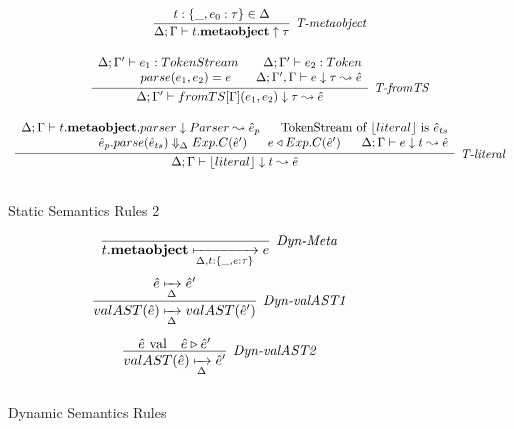 \begin{figure}
\[\begin{array}{c}
\infer[\textit{T-metaobject}]
        {\Delta; \Gamma \vdash t.\keyw{metaobject} \uparrow \tau   }
	{t:\{\_, e_0:\tau\} \in \Delta} \\[3ex]


\infer[\textit{T-fromTS}]
	  {\Delta; \Gamma' \vdash fromTS[\Gamma](e_1,e_2) \downarrow \tau \leadsto \hat{e} }
	  {\renewcommand{\arraystretch}{1}
	    \begin{array}{r}
	    \Delta;\Gamma' \vdash e_1:TokenStream ~~~~~~ \Delta;\Gamma' \vdash e_2:Token\\
            parse(e_1,e_2)=e ~~~~~~\Delta; \Gamma', \Gamma \vdash e \downarrow \tau \leadsto \hat{e}
            \end{array}
       } \\[3ex]  

\infer[\textit{T-literal}]
	  {\Delta; \Gamma \vdash \lfloor literal \rfloor \downarrow t \leadsto \hat{e} }
	  {\renewcommand{\arraystretch}{1}
	    \begin{array}{r}
	    \Delta;\Gamma \vdash t.\keyw{metaobject}.parser\downarrow Parser \leadsto \hat{e}_p ~~~~~ \text{TokenStream of~} \lfloor literal \rfloor\ \text{is}\ \hat{e}_{ts}\\
            \hat{e}_p.parse(\hat{e}_{ts}) \Downarrow_{\Delta} Exp.C(\hat{e}') ~~~~~  e \triangleleft Exp.C(\hat{e}')~~~~~ \Delta;\Gamma\vdash e\downarrow t \leadsto \hat{e}
            \end{array}
       } \\[3ex]   
\end{array}
\]
\caption{Static Semantics Rules 2}
\end{figure}

\begin{figure}
\centering
\[
\begin{array}{c}

\infer[\textit{Dyn-Meta}]
	{t.\keyw{metaobject} \xmapsto[\Delta,t:\{\_,e:\tau \}]{} e} 
	{}\\[3ex]

\infer[\textit{Dyn-valAST1}]
	{valAST(\hat{e}) \xmapsto[\Delta]{} valAST(\hat{e}') } 
	{\hat{e} \xmapsto[\Delta]{} \hat{e}'}\\[3ex]

\infer[\textit{Dyn-valAST2}]
	{valAST(\hat{e}) \xmapsto[\Delta]{} \hat{e}' } 
	{\hat{e}\ \text{val} &\hat{e} \triangleright \hat{e}' }\\[3ex]




\end{array}
\]
\caption{Dynamic Semantics Rules}
\end{figure}





